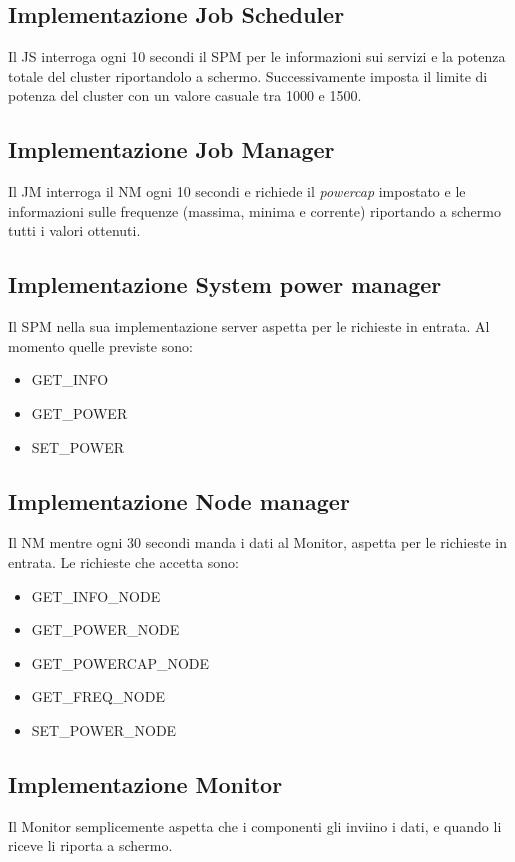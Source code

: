 \subsection*{Implementazione Job Scheduler}
Il JS interroga ogni 10 secondi il SPM per le informazioni sui servizi e la potenza totale del cluster riportandolo a schermo. Successivamente  imposta il limite di potenza del cluster con un valore casuale tra 1000 e 1500.

\subsection*{Implementazione Job Manager}
Il JM interroga il NM ogni 10 secondi e richiede il \emph{powercap} impostato e le informazioni sulle frequenze (massima, minima e corrente) riportando a schermo tutti i valori ottenuti.

\subsection*{Implementazione System power manager}
Il SPM nella sua implementazione server aspetta per le richieste in entrata. Al momento quelle previste sono:
\begin{itemize}
    \item GET\_INFO
    \item GET\_POWER
    \item SET\_POWER
\end{itemize}

\subsection*{Implementazione Node manager}
Il NM mentre ogni 30 secondi manda i dati al Monitor, aspetta per le richieste in entrata. Le richieste che accetta sono:
\begin{itemize}
    \item GET\_INFO\_NODE
    \item GET\_POWER\_NODE
    \item GET\_POWERCAP\_NODE 
    \item GET\_FREQ\_NODE   
    \item SET\_POWER\_NODE
\end{itemize}

\subsection*{Implementazione Monitor}
Il Monitor semplicemente aspetta che i componenti gli inviino i dati, e quando li riceve li riporta a schermo.

